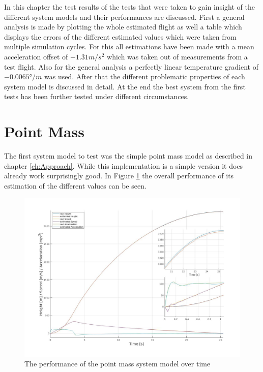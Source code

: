 In this chapter the test results of the tests that were taken to gain insight of the different system models and their performances are discussed.
First a general analysis is made by plotting the whole estimated flight as well a table which displays the errors of the different estimated values which were taken from multiple simulation cycles.
For this all estimations have been made with a mean acceleration offset of $ -1.31 m/s^2$  which was taken out of measurements from a test flight.
Also for the general analysis a perfectly linear temperature gradient of $-0.0065 °/m$ was used.
After that the different problematic properties of each system model is discussed in detail.
At the end the best system from the first tests has been further tested under different circumstances.


\section{Point Mass}
The first system model to test was the simple point mass model as described in chapter \ref{ch:Approach}.
While this implementation is a simple version it does already work surprisingly good.
In Figure \ref{fig:PointMassPerformance} the overall performance of its estimation of the different values can be seen.


\begin{figure}[h!]
 \centering
 \includegraphics[width=.8\textwidth]{./Pictures/PointMassPerformance.jpg}
 \caption{The performance of the point mass system model over time}
 \label{fig:PointMassPerformance}
\end{figure}

